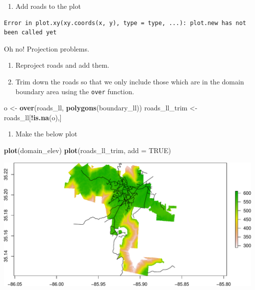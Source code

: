 \documentclass[
]{book}
\newenvironment{Shaded}{\begin{snugshade}}{\end{snugshade}}
\newcommand{\DataTypeTok}[1]{\textcolor[rgb]{0.13,0.29,0.53}{#1}}
\newcommand{\KeywordTok}[1]{\textcolor[rgb]{0.13,0.29,0.53}{\textbf{#1}}}
\newcommand{\NormalTok}[1]{#1}
\newcommand{\OperatorTok}[1]{\textcolor[rgb]{0.81,0.36,0.00}{\textbf{#1}}}
\newcommand{\OtherTok}[1]{\textcolor[rgb]{0.56,0.35,0.01}{#1}}
\newcommand{\StringTok}[1]{\textcolor[rgb]{0.31,0.60,0.02}{#1}}
\providecommand{\tightlist}{%
  \setlength{\itemsep}{0pt}\setlength{\parskip}{0pt}}
\begin{document}
\begin{enumerate}
\def\labelenumi{\arabic{enumi}.}
\setcounter{enumi}{23}
\tightlist
\item
  Add roads to the plot
\end{enumerate}

\begin{verbatim}
Error in plot.xy(xy.coords(x, y), type = type, ...): plot.new has not been called yet
\end{verbatim}

Oh no! Projection problems.

\begin{enumerate}
\def\labelenumi{\arabic{enumi}.}
\setcounter{enumi}{24}
\item
  Reproject roads and add them.
\item
  Trim down the roads so that we only include those which are in the domain boundary area using the \texttt{over} function.
\end{enumerate}

\begin{Shaded}
\begin{Highlighting}[]
\NormalTok{o <-}\StringTok{ }\KeywordTok{over}\NormalTok{(roads_ll, }\KeywordTok{polygons}\NormalTok{(boundary_ll))}
\NormalTok{roads_ll_trim <-}\StringTok{ }\NormalTok{roads_ll[}\OperatorTok{!}\KeywordTok{is.na}\NormalTok{(o),]}
\end{Highlighting}
\end{Shaded}

\begin{enumerate}
\def\labelenumi{\arabic{enumi}.}
\setcounter{enumi}{26}
\tightlist
\item
  Make the below plot
\end{enumerate}

\begin{Shaded}
\begin{Highlighting}[]
\KeywordTok{plot}\NormalTok{(domain_elev)}
\KeywordTok{plot}\NormalTok{(roads_ll_trim, }\DataTypeTok{add =} \OtherTok{TRUE}\NormalTok{)}
\end{Highlighting}
\end{Shaded}

\includegraphics{figures/unnamed-chunk-434-1.pdf}
\end{document}
